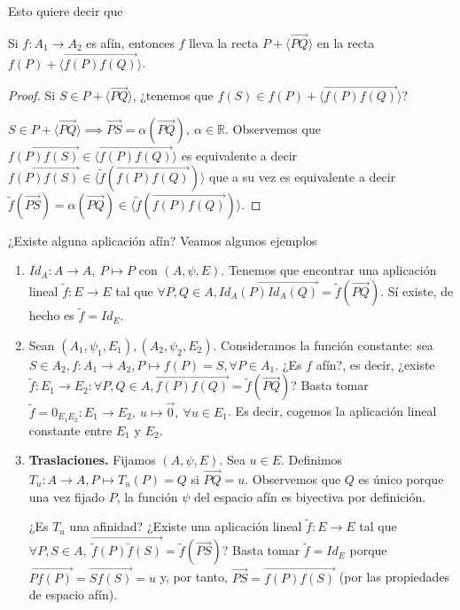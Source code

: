 \documentclass[14pt]{book}
\begin{document}
Esto quiere decir que

\begin{obs}
	Si $f : A_1 \to A_2$ es afín, entonces $f$ lleva la recta $P + \langle\overrightarrow{PQ}\rangle$ en la recta $f(P) + \langle\overrightarrow{f(P) f(Q)}\rangle$.
	
	\begin{proof}
		Si $S \in P + \langle\overrightarrow{PQ}\rangle$, ¿tenemos que $f(S) \in f(P) + \langle\overrightarrow{f(P) f(Q)}\rangle$?
		
		$S \in P + \langle\overrightarrow{PQ}\rangle \implies \overrightarrow{PS} = \alpha(\overrightarrow{PQ}),\ \alpha \in \mathbb{R}$. Observemos que $\overrightarrow{f(P) f(S)} \in \langle \overrightarrow{f(P) f(Q)}\rangle$ es equivalente a decir $\overrightarrow{f(P) f(S)} \in \langle \tilde{f}(\overrightarrow{f(P) f(Q)})\rangle$ que a su vez es equivalente a decir $\tilde{f}(\overrightarrow{PS}) = \alpha(\overrightarrow{PQ}) \in \langle \tilde{f}(\overrightarrow{f(P) f(Q)})\rangle$.
	\end{proof}
\end{obs}


\begin{ej}
	¿Existe alguna aplicación afín? Veamos algunos ejemplos
	\begin{enumerate}
		\item $Id_A : A \to A,\ P \mapsto P$ con $(A, \psi, E)$. Tenemos que encontrar una aplicación lineal $\tilde{f} : E \to E$ tal que $\forall P, Q \in A, \overrightarrow{Id_A(P) Id_A(Q)} = \tilde{f}(\overrightarrow{PQ})$. Sí existe, de hecho es $\tilde{f} = Id_E$.
		\item Sean $(A_1, \psi_1, E_1), (A_2, \psi_2, E_2)$. Consideramos la función constante: sea $S \in A_2, f: A_1 \to A_2, P \mapsto f(P) = S, \forall P \in A_1$. ¿Es $f$ afín?, es decir, ¿existe $\tilde{f} : E_1 \to E_2: \forall P, Q \in A, \overrightarrow{f(P)f(Q)} = \tilde{f}(\overrightarrow{PQ})$? Basta tomar $\tilde{f} = 0_{E_1 E_2} : E_1 \to E_2,\ u \mapsto \vec{0},\ \forall u \in E_1$. Es decir, cogemos la aplicación lineal constante entre $E_1$ y $E_2$. 
		\item \textbf{Traslaciones.} Fijamos $(A, \psi, E)$. Sea $u \in E$. Definimos $T_u : A \to A, P \mapsto T_u(P) = Q$ si $\overrightarrow{PQ} = u$. Observemos que $Q$ es único porque una vez fijado $P$, la función $\psi$ del espacio afín es biyectiva por definición.
		
		¿Es $T_u$ una afinidad? ¿Existe una aplicación lineal $\tilde{f} : E \to E$ tal que $\forall P, S \in A,\ \overrightarrow{\tilde{f}(P)\tilde{f}(S)} = \tilde{f}(\overrightarrow{PS})$? Basta tomar $\tilde{f} = Id_E$ porque $\overrightarrow{P f(P)} = \overrightarrow{S f(S)} = u$ y, por tanto, $\overrightarrow{PS} = \overrightarrow{f(P) f(S)}$ (por las propiedades de espacio afín).
	\end{enumerate}
\end{ej}
\end{document}
